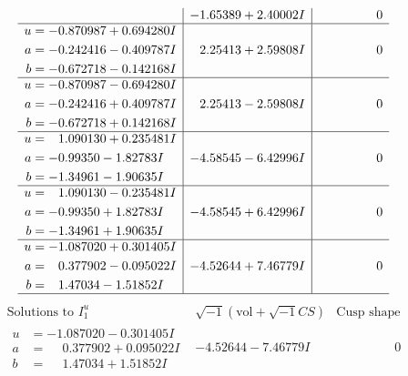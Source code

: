 \documentclass[1p]{elsarticle_modified}
\theoremstyle{definition}
\newcommand{\I}{\sqrt{-1}}
\begin{document}
$$\begin{array}{c|c|c}
 & -1.65389 + 2.40002 I & \phantom{-0.000000 } 0 \\ \hline\begin{aligned}
u &= -0.870987 + 0.694280 I \\
a &= -0.242416 - 0.409787 I \\
b &= -0.672718 - 0.142168 I\end{aligned}
 & \phantom{-}2.25413 + 2.59808 I & \phantom{-0.000000 } 0 \\ \hline\begin{aligned}
u &= -0.870987 - 0.694280 I \\
a &= -0.242416 + 0.409787 I \\
b &= -0.672718 + 0.142168 I\end{aligned}
 & \phantom{-}2.25413 - 2.59808 I & \phantom{-0.000000 } 0 \\ \hline\begin{aligned}
u &= \phantom{-}1.090130 + 0.235481 I \\
a &= -0.99350 - 1.82783 I \\
b &= -1.34961 - 1.90635 I\end{aligned}
 & -4.58545 - 6.42996 I & \phantom{-0.000000 } 0 \\ \hline\begin{aligned}
u &= \phantom{-}1.090130 - 0.235481 I \\
a &= -0.99350 + 1.82783 I \\
b &= -1.34961 + 1.90635 I\end{aligned}
 & -4.58545 + 6.42996 I & \phantom{-0.000000 } 0 \\ \hline\begin{aligned}
u &= -1.087020 + 0.301405 I \\
a &= \phantom{-}0.377902 - 0.095022 I \\
b &= \phantom{-}1.47034 - 1.51852 I\end{aligned}
 & -4.52644 + 7.46779 I & \phantom{-0.000000 } 0\\
 \hline 
 \end{array}$$\newpage$$\begin{array}{c|c|c}  
\text{Solutions to }I^u_{1}& \I (\text{vol} + \sqrt{-1}CS) & \text{Cusp shape}\\
 \hline 
\begin{aligned}
u &= -1.087020 - 0.301405 I \\
a &= \phantom{-}0.377902 + 0.095022 I \\
b &= \phantom{-}1.47034 + 1.51852 I\end{aligned}
 & -4.52644 - 7.46779 I & \phantom{-0.000000 } 0 \\ \hline\begin{aligned}

\end{aligned}
\end{array}$$
\end{document}
